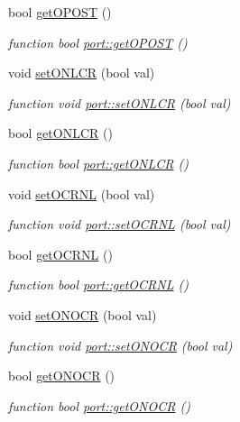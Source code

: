 \begin{DoxyCompactItemize}
bool \hyperlink{classport_a622d4dabe322c92f2721d0fdaa35d583}{get\+O\+P\+O\+ST} ()
\begin{DoxyCompactList}\small\item\em function bool \hyperlink{classport_a622d4dabe322c92f2721d0fdaa35d583}{port\+::get\+O\+P\+O\+ST} () \end{DoxyCompactList}\item 
void \hyperlink{classport_aa44c9d03000e78c1797fcc02023e0a30}{set\+O\+N\+L\+CR} (bool val)
\begin{DoxyCompactList}\small\item\em function void \hyperlink{classport_aa44c9d03000e78c1797fcc02023e0a30}{port\+::set\+O\+N\+L\+CR} (bool val) \end{DoxyCompactList}\item 
bool \hyperlink{classport_a5c5529b9412799359a9a063d8694baa1}{get\+O\+N\+L\+CR} ()
\begin{DoxyCompactList}\small\item\em function bool \hyperlink{classport_a5c5529b9412799359a9a063d8694baa1}{port\+::get\+O\+N\+L\+CR} () \end{DoxyCompactList}\item 
void \hyperlink{classport_af9ff8713572bcacfd765f13d6dcb8a61}{set\+O\+C\+R\+NL} (bool val)
\begin{DoxyCompactList}\small\item\em function void \hyperlink{classport_af9ff8713572bcacfd765f13d6dcb8a61}{port\+::set\+O\+C\+R\+NL} (bool val) \end{DoxyCompactList}\item 
bool \hyperlink{classport_aac6ca3065f7bb33386af3a9e0ed0a0a1}{get\+O\+C\+R\+NL} ()
\begin{DoxyCompactList}\small\item\em function bool \hyperlink{classport_aac6ca3065f7bb33386af3a9e0ed0a0a1}{port\+::get\+O\+C\+R\+NL} () \end{DoxyCompactList}\item 
void \hyperlink{classport_a68f1dc6b5d1250c2c6a3bc4e1f435b1b}{set\+O\+N\+O\+CR} (bool val)
\begin{DoxyCompactList}\small\item\em function void \hyperlink{classport_a68f1dc6b5d1250c2c6a3bc4e1f435b1b}{port\+::set\+O\+N\+O\+CR} (bool val) \end{DoxyCompactList}\item 
bool \hyperlink{classport_a2a7a1ac23b994b559dc45c6c1e20c46b}{get\+O\+N\+O\+CR} ()
\begin{DoxyCompactList}\small\item\em function bool \hyperlink{classport_a2a7a1ac23b994b559dc45c6c1e20c46b}{port\+::get\+O\+N\+O\+CR} () \end{DoxyCompactList}\item 

\end{DoxyCompactItemize}
